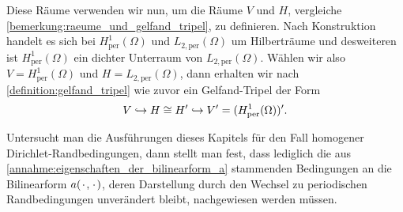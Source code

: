 \documentclass[../main.tex]{subfiles}
\begin{document}
Diese Räume verwenden wir nun, um die Räume $V$ und $H$, vergleiche \cref{bemerkung:raeume_und_gelfand_tripel}, zu definieren.
Nach Konstruktion handelt es sich bei $H^{1}_{\text{per}}(\Omega)$ und $L_{2,\text{per}}(\Omega)$ um Hilberträume und desweiteren ist $H^{1}_{\text{per}}(\Omega)$ ein dichter Unterraum von $L_{2,\text{per}}(\Omega)$.
Wählen wir also $V = H^{1}_{\text{per}}(\Omega)$ und $H = L_{2,\text{per}}(\Omega)$, dann erhalten wir nach \cref{definition:gelfand_tripel} wie zuvor ein Gelfand-Tripel der Form
\begin{equation}
    V \hookrightarrow H \cong H' \hookrightarrow V' = (H^{1}_{\text{per}}(\Omega))'.
\end{equation}

Untersucht man die Ausführungen dieses Kapitels für den Fall homogener Dirichlet-Randbedingungen, dann stellt man fest, dass lediglich die aus \cref{annahme:eigenschaften_der_bilinearform_a} stammenden Bedingungen an die Bilinearform $a({\mkern2mu\cdot\mkern2mu}, {\mkern2mu\cdot\mkern2mu})$, deren Darstellung durch den Wechsel zu periodischen Randbedingungen unverändert bleibt, nachgewiesen werden müssen.
\end{document}
